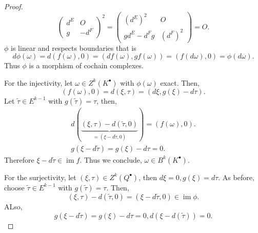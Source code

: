 \documentclass[10pt]{article}
\DeclareMathOperator{\image}{im}
\begin{document}
\begin{proof}
  \begin{equation*}
    \begin{pmatrix}
      d^E & O\\
      g & -d^F
    \end{pmatrix}^2 = \begin{pmatrix}
      (d^E)^2 & O\\
      gd^E-d^Fg & (d^F)^2
    \end{pmatrix}=O.
  \end{equation*}
  $\phi$ is linear and respects boundaries that is 
  \begin{equation*}
    d\phi(\omega) = d(f(\omega),0) = (df(\omega),gf(\omega))=(f(d\omega),0)=\phi(d\omega).
  \end{equation*}
  Thus $\phi$ is a morphism of cochain complexes.
  \par For the injectivity, let $\omega\in Z^k(K^\bullet)$ with $\phi(\omega)$ exact. Then,
  \begin{equation*}
  (f(\omega),0) = d(\xi,\tau)=(d\xi,g(\xi)-d\tau).
  \end{equation*}
  Let $\tilde{\tau}\in E^{k-1}$ with $g(\tilde{\tau})=\tau$, then,
  \begin{align*}
    d(\underbrace{(\xi,\tau)-d(\tilde{\tau},0)}_{=(\xi-d\tilde{\tau},0)})=(f(\omega),0).\\
    g(\xi-d\tilde{\tau})=g(\xi)-d\tau=0.
  \end{align*}
  Therefore $\xi-d\tilde{\tau}\in\image f$. Thus we conclude, $\omega\in B^k(K^\bullet)$.
  \par For the surjectivity, let $(\xi,\tau)\in Z^k(Q^\bullet)$, then $d\xi=0,g(\xi) = d\tau$. As before, choose $\tilde{\tau}\in E^{k-1}$ with $g(\tilde{\tau}) = \tau$. Then,
  \begin{equation*}
    (\xi,\tau)-d(\tilde{\tau},0)=(\xi-d\tilde{\tau},0)\in\image\phi.
  \end{equation*}
  ALso,
  \begin{equation*}
    g(\xi-d\tilde{\tau})=g(\xi)-d\tau=0,d(\xi-d(\tilde{\tau}))=0.
  \end{equation*}
\end{proof}
\end{document}
